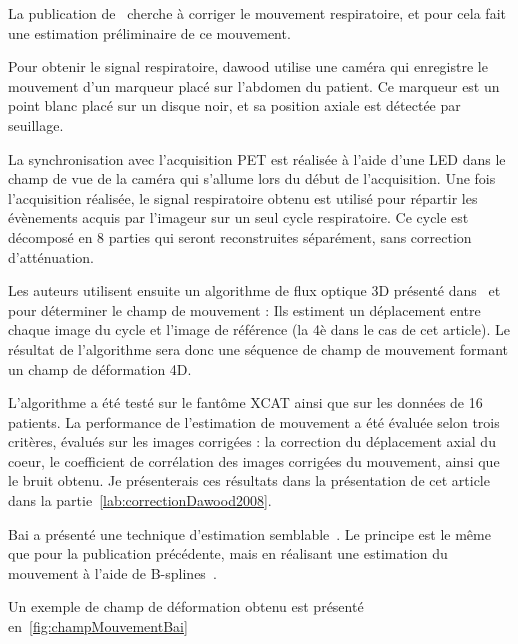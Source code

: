 La publication de~\cite{dawood2008respiratory} cherche à corriger le mouvement respiratoire, et pour cela fait une estimation préliminaire de ce mouvement. 

Pour obtenir le signal respiratoire, dawood utilise une caméra qui enregistre le mouvement d'un marqueur placé sur l'abdomen du patient. Ce marqueur est un point blanc placé sur un disque noir, et sa position axiale est détectée par seuillage. 

La synchronisation avec l'acquisition PET est réalisée à l'aide d'une LED dans le champ de vue de la caméra qui s'allume lors du début de l'acquisition. Une fois l'acquisition réalisée, le signal respiratoire obtenu est utilisé pour répartir les évènements acquis par l'imageur sur un seul cycle respiratoire. Ce cycle est décomposé en 8 parties qui seront reconstruites séparément, sans correction d'atténuation. 

Les auteurs utilisent ensuite un algorithme de flux optique 3D présenté dans~\cite{dawood2006lung} et~\cite{horn1981determining} pour déterminer le champ de mouvement : Ils estiment un déplacement entre chaque image du cycle et l'image de référence (la 4è dans le cas de cet article). Le résultat de l'algorithme sera donc une séquence de champ de mouvement formant un champ de déformation 4D.

L'algorithme a été testé sur le fantôme XCAT ainsi que sur les données de 16 patients. La performance de l'estimation de mouvement a été évaluée selon trois critères, évalués sur les images corrigées : la correction du déplacement axial du coeur, le coefficient de corrélation des images corrigées du mouvement, ainsi que le bruit obtenu. Je présenterais ces résultats dans la présentation de cet article dans la partie~\ref{lab:correctionDawood2008}.

Bai a présenté une technique d'estimation semblable~\cite{bai2009regularized}. Le principe est le même que pour la publication précédente, mais en réalisant une estimation du mouvement à l'aide de B-splines~\cite{thevenaz2000optimization}.

Un exemple de champ de déformation obtenu est présenté en~\ref{fig:champMouvementBai}

